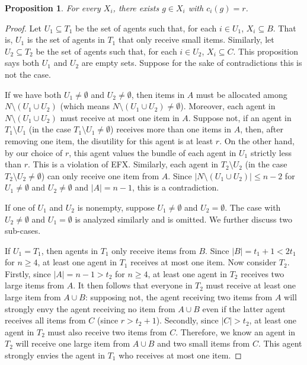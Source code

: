 \documentclass{article}
\newtheorem{proposition}{Proposition}
\theoremstyle{definition}
\begin{document}
\begin{proposition}\label{prop:PO-exist-large}
    For every $X_i$, there exists $g\in X_i$ with $c_i(g)=r$.
\end{proposition}
\begin{proof}
    Let $U_1\subseteq T_1$ be the set of agents such that, for each $i\in U_1$, $X_i\subseteq B$.
    That is, $U_1$ is the set of agents in $T_1$ that only receive small items.
    Similarly, let $U_2\subseteq T_2$ be the set of agents such that, for each $i\in U_2$, $X_i\subseteq C$.
    This proposition says both $U_1$ and $U_2$ are empty sets.
    Suppose for the sake of contradictions this is not the case.

    If we have both $U_1\neq\emptyset$ and $U_2\neq\emptyset$, then items in $A$ must be allocated among $N\setminus(U_1\cup U_2)$ (which means $N\setminus(U_1\cup U_2)\neq\emptyset$).
    Moreover, each agent in $N\setminus(U_1\cup U_2)$  must receive at most one item in $A$.
    Suppose not, if an agent in $T_1\setminus U_1$ (in the case $T_1\setminus U_1\neq\emptyset$) receives more than one items in $A$, then, after removing one item, the disutility for this agent is at least $r$.
    On the other hand, by our choice of $r$, this agent values the bundle of each agent in $U_1$ strictly less than $r$.
    This is a violation of EFX.
    Similarly, each agent in $T_2\setminus U_2$ (in the case $T_2\setminus U_2\neq\emptyset$) can only receive one item from $A$.
    Since $|N\setminus(U_1\cup U_2)|\leq n-2$ for $U_1\neq\emptyset$ and $U_2\neq\emptyset$ and $|A|=n-1$, this is a contradiction.

    If one of $U_1$ and $U_2$ is nonempty, suppose $U_1\neq\emptyset$ and $U_2=\emptyset$. The case with $U_2\neq\emptyset$ and $U_1=\emptyset$ is analyzed similarly and is omitted.
    We further discuss two sub-cases.

    If $U_1=T_1$, then agents in $T_1$ only receive items from $B$. Since $|B|=t_1+1<2t_1$ for $n\geq 4$, at least one agent in $T_1$ receives at most one item.
    Now consider $T_2$.
    Firstly, since $|A|=n-1>t_2$ for $n\geq 4$, at least one agent in $T_2$ receives two large items from $A$.
    It then follows that everyone in $T_2$ must receive at least one large item from $A\cup B$: supposing not, the agent receiving two items from $A$ will strongly envy the agent receiving no item from $A\cup B$ even if the latter agent receives all items from $C$ (since $r>t_2+1$).
    Secondly, since $|C|>t_2$, at least one agent in $T_2$ must also receive two items from $C$.
    Therefore, we know an agent in $T_2$ will receive one large item from $A\cup B$ and two small items from $C$.
    This agent strongly envies the agent in $T_1$ who receives at most one item.


\end{proof}
\end{document}

